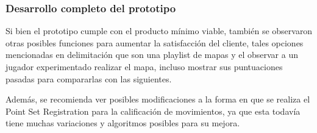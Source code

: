 \subsubsection{Desarrollo completo del prototipo}

Si bien el prototipo cumple con el producto mínimo viable, también se observaron otras posibles funciones para aumentar la satisfacción del cliente, tales opciones mencionadas en delimitación que son una playlist de mapas y el observar a un jugador experimentado realizar el mapa, incluso mostrar sus puntuaciones pasadas para compararlas con las siguientes.

Además, se recomienda ver posibles modificaciones a la forma en que se realiza el Point Set Registration para la calificación de movimientos, ya que esta todavía tiene muchas variaciones y algoritmos posibles para su mejora.
